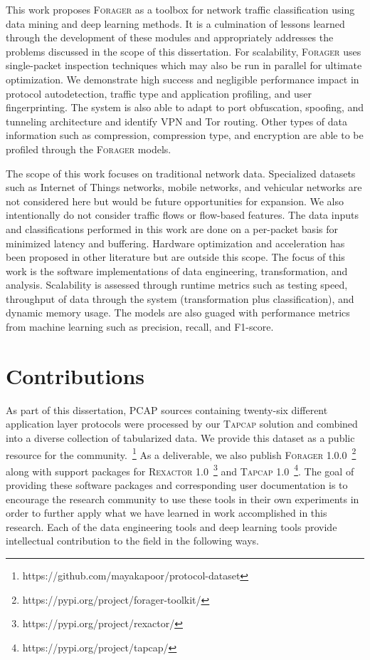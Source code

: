 This work proposes \textsc{Forager} as a toolbox for network traffic classification using data mining and deep learning methods. It is a culmination of lessons learned through the development of these modules and appropriately addresses the problems discussed in the scope of this dissertation. For scalability, \textsc{Forager} uses single-packet inspection techniques which may also be run in parallel for ultimate optimization. We demonstrate high success and negligible performance impact in protocol autodetection, traffic type and application profiling, and user fingerprinting. The system is also able to adapt to port obfuscation, spoofing, and tunneling architecture and identify VPN and Tor routing. Other types of data information such as compression, compression type, and encryption are able to be profiled through the \textsc{Forager} models.

The scope of this work focuses on traditional network data. Specialized datasets such as Internet of Things networks, mobile networks, and vehicular networks are not considered here but would be future opportunities for expansion. We also intentionally do not consider traffic flows or flow-based features. The data inputs and classifications performed in this work are done on a per-packet basis for minimized latency and buffering. Hardware optimization and acceleration has been proposed in other literature but are outside this scope. The focus of this work is the software implementations of data engineering, transformation, and analysis. Scalability is assessed through runtime metrics such as testing speed, throughput of data through the system (transformation plus classification), and dynamic memory usage. The models are also guaged with performance metrics from machine learning such as precision, recall, and F1-score.

\section{Contributions}

As part of this dissertation, PCAP sources containing twenty-six different application layer protocols were processed by our \textsc{Tapcap} solution and combined into a diverse collection of tabularized data. We provide this dataset as a public resource for the community.~\footnote{https://github.com/mayakapoor/protocol-dataset} As a deliverable, we also publish \textsc{Forager 1.0.0}~\footnote{https://pypi.org/project/forager-toolkit/} along with support packages for \textsc{Rexactor 1.0}~\footnote{https://pypi.org/project/rexactor/} and \textsc{Tapcap 1.0}~\footnote{https://pypi.org/project/tapcap/}. The goal of providing these software packages and corresponding user documentation is to encourage the research community to use these tools in their own experiments in order to further apply what we have learned in work accomplished in this research. Each of the data engineering tools and deep learning tools provide intellectual contribution to the field in the following ways.

